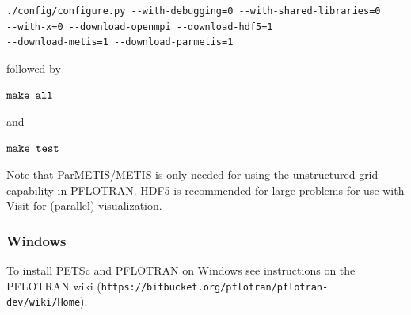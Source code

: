 \documentclass[12pt]{article}
\begin{document}
\begin{verbatim}
./config/configure.py --with-debugging=0 --with-shared-libraries=0 
--with-x=0 --download-openmpi --download-hdf5=1 
--download-metis=1 --download-parmetis=1
\end{verbatim}

\noindent
followed by

$\verb|make all|$

\noindent
and

$\verb|make test|$

Note that ParMETIS/METIS is only needed for using the unstructured grid capability in PFLOTRAN. HDF5 is recommended for large problems for use with Visit for (parallel) visualization.

\subsubsection{Windows}

To install PETSc and PFLOTRAN on Windows see instructions on the PFLOTRAN wiki \linebreak ({\tt https://bitbucket.org/pflotran/pflotran-dev/wiki/Home}).
\end{document}
